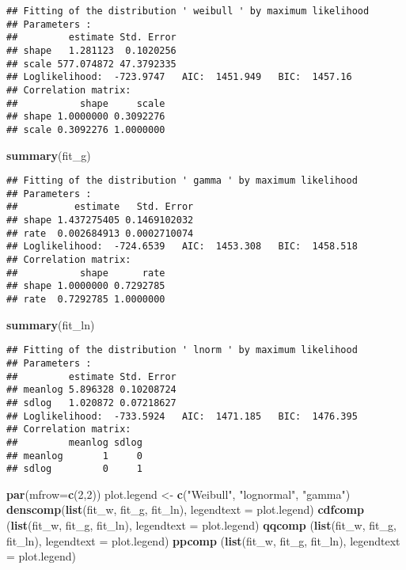 \documentclass[]{article}
\newenvironment{Shaded}{\begin{snugshade}}{\end{snugshade}}
\newcommand{\DataTypeTok}[1]{\textcolor[rgb]{0.13,0.29,0.53}{#1}}
\newcommand{\DecValTok}[1]{\textcolor[rgb]{0.00,0.00,0.81}{#1}}
\newcommand{\KeywordTok}[1]{\textcolor[rgb]{0.13,0.29,0.53}{\textbf{#1}}}
\newcommand{\NormalTok}[1]{#1}
\newcommand{\StringTok}[1]{\textcolor[rgb]{0.31,0.60,0.02}{#1}}
\begin{document}
\begin{verbatim}
## Fitting of the distribution ' weibull ' by maximum likelihood 
## Parameters : 
##         estimate Std. Error
## shape   1.281123  0.1020256
## scale 577.074872 47.3792335
## Loglikelihood:  -723.9747   AIC:  1451.949   BIC:  1457.16 
## Correlation matrix:
##           shape     scale
## shape 1.0000000 0.3092276
## scale 0.3092276 1.0000000
\end{verbatim}

\begin{Shaded}
\begin{Highlighting}[]
\KeywordTok{summary}\NormalTok{(fit_g)}
\end{Highlighting}
\end{Shaded}

\begin{verbatim}
## Fitting of the distribution ' gamma ' by maximum likelihood 
## Parameters : 
##          estimate   Std. Error
## shape 1.437275405 0.1469102032
## rate  0.002684913 0.0002710074
## Loglikelihood:  -724.6539   AIC:  1453.308   BIC:  1458.518 
## Correlation matrix:
##           shape      rate
## shape 1.0000000 0.7292785
## rate  0.7292785 1.0000000
\end{verbatim}

\begin{Shaded}
\begin{Highlighting}[]
\KeywordTok{summary}\NormalTok{(fit_ln)}
\end{Highlighting}
\end{Shaded}

\begin{verbatim}
## Fitting of the distribution ' lnorm ' by maximum likelihood 
## Parameters : 
##         estimate Std. Error
## meanlog 5.896328 0.10208724
## sdlog   1.020872 0.07218627
## Loglikelihood:  -733.5924   AIC:  1471.185   BIC:  1476.395 
## Correlation matrix:
##         meanlog sdlog
## meanlog       1     0
## sdlog         0     1
\end{verbatim}

\begin{Shaded}
\begin{Highlighting}[]
\KeywordTok{par}\NormalTok{(}\DataTypeTok{mfrow=}\KeywordTok{c}\NormalTok{(}\DecValTok{2}\NormalTok{,}\DecValTok{2}\NormalTok{))}
\NormalTok{plot.legend <-}\StringTok{ }\KeywordTok{c}\NormalTok{(}\StringTok{"Weibull"}\NormalTok{, }\StringTok{"lognormal"}\NormalTok{, }\StringTok{"gamma"}\NormalTok{)}
\KeywordTok{denscomp}\NormalTok{(}\KeywordTok{list}\NormalTok{(fit_w, fit_g, fit_ln), }\DataTypeTok{legendtext =}\NormalTok{ plot.legend)}
\KeywordTok{cdfcomp}\NormalTok{ (}\KeywordTok{list}\NormalTok{(fit_w, fit_g, fit_ln), }\DataTypeTok{legendtext =}\NormalTok{ plot.legend)}
\KeywordTok{qqcomp}\NormalTok{  (}\KeywordTok{list}\NormalTok{(fit_w, fit_g, fit_ln), }\DataTypeTok{legendtext =}\NormalTok{ plot.legend)}
\KeywordTok{ppcomp}\NormalTok{  (}\KeywordTok{list}\NormalTok{(fit_w, fit_g, fit_ln), }\DataTypeTok{legendtext =}\NormalTok{ plot.legend)}
\end{Highlighting}
\end{Shaded}
\end{document}
